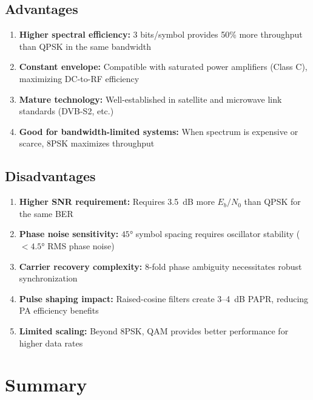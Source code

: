 \subsection*{Advantages}

\begin{enumerate}
\item \textbf{Higher spectral efficiency:} 3 bits/symbol provides 50\% more throughput than QPSK in the same bandwidth
\item \textbf{Constant envelope:} Compatible with saturated power amplifiers (Class C), maximizing DC-to-RF efficiency
\item \textbf{Mature technology:} Well-established in satellite and microwave link standards (DVB-S2, etc.)
\item \textbf{Good for bandwidth-limited systems:} When spectrum is expensive or scarce, 8PSK maximizes throughput
\end{enumerate}

\subsection*{Disadvantages}

\begin{enumerate}
\item \textbf{Higher SNR requirement:} Requires 3.5~dB more $E_b/N_0$ than QPSK for the same BER
\item \textbf{Phase noise sensitivity:} $45°$ symbol spacing requires oscillator stability ($< 4.5°$ RMS phase noise)
\item \textbf{Carrier recovery complexity:} 8-fold phase ambiguity necessitates robust synchronization
\item \textbf{Pulse shaping impact:} Raised-cosine filters create 3--4~dB PAPR, reducing PA efficiency benefits
\item \textbf{Limited scaling:} Beyond 8PSK, QAM provides better performance for higher data rates
\end{enumerate}

\section{Summary}

